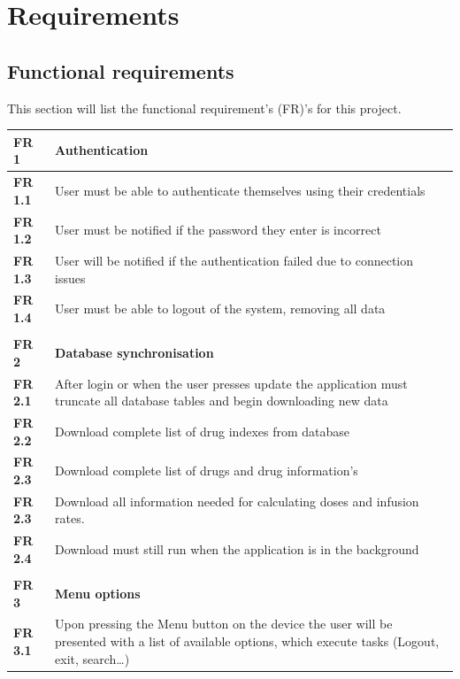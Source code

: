 \documentclass[11pt,fleqn,twoside]{article}
\begin{document}
\section{Requirements}
\subsection{Functional requirements}
This section will list the functional requirement's (FR)'s for this project.

\begin{center}
\begin{longtable}{| l | p{14.3cm} |}
\hline
\textbf{FR 1}   & \textbf{Authentication}   \\ \hline
\textbf{FR 1.1} & User must be able to authenticate themselves using their credentials   \\ \hline
\textbf{FR 1.2} & User must be notified if the password they enter is incorrect\\ \hline
\textbf{FR 1.3} & User will be notified if the authentication failed due to connection issues \\ \hline
\textbf{FR 1.4} & User must be able to logout of the system, removing all data \\ \hline
\textbf{}  &  \\ \hline
\textbf{FR 2}   & \textbf{Database synchronisation}   \\ \hline
\textbf{FR 2.1} & After login or when the user presses update the application must truncate all database tables and begin downloading new data  \\ \hline
\textbf{FR 2.2} & Download complete list of drug indexes from database    \\ \hline
\textbf{FR 2.3} & Download complete list of drugs and drug information’s  \\ \hline
\textbf{FR 2.3} & Download all information needed for calculating doses and infusion rates.   \\ \hline
\textbf{FR 2.4} & Download must still run when the application is in the background \\ \hline
\textbf{}  &  \\ \hline
\textbf{FR 3}   & \textbf{Menu options}\\ \hline
\textbf{FR 3.1} & Upon pressing the Menu button on the device the user will be presented with a list of available options, which execute tasks (Logout, exit, search…)   \\ \hline

\end{longtable}
\end{center}
\end{document}
